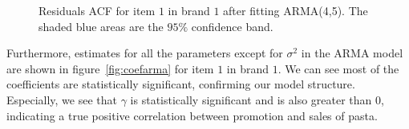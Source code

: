 \documentclass{article}
\begin{document}
\begin{figure}[!ht]
\centering
{}
\caption{Residuals ACF for item $1$ in brand $1$ after fitting ARMA(4,5). The shaded blue areas are the $95\%$ confidence band.}
\label{fig:racf}
\end{figure}

\noindent Furthermore, estimates for all the parameters except for $\sigma^2$ in the ARMA model are shown in figure~\ref{fig:coefarma} for item $1$ in brand $1$. We can see most of the coefficients are statistically significant, confirming our model structure. Especially, we see that $\gamma$ is statistically significant and is also greater than $0$, indicating a true positive correlation between promotion and sales of pasta.
\end{document}
